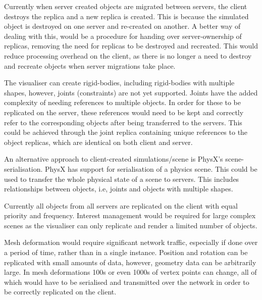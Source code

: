 Currently when server created objects are migrated between servers, the client destroys the replica and a new replica is created. This is because the simulated object is destroyed on one server and re-created on another. A better way of dealing with this, would be a procedure for handing over server-ownership of replicas, removing the need for replicas to be destroyed and recreated. This would reduce processing overhead on the client, as there is no longer a need to destroy and recreate objects when server migrations take place.


The visualiser can create rigid-bodies, including rigid-bodies with multiple shapes, however, joints (constraints) are not yet supported. Joints have the added complexity of needing references to multiple objects. In order for these to be replicated on the server, these references would need to be kept and correctly refer to the corresponding objects after being transferred to the servers. This could be achieved through the joint replica containing unique references to the object replicas, which are identical on both client and server.

An alternative approach to client-created simulations/scene is PhysX's scene-serialisation. PhysX has support for serialisation of a physics scene. This could be used to transfer the whole physical state of a scene to servers. This includes relationships between objects, i.e, joints and objects with multiple shapes.

Currently all objects from all servers are replicated on the client with equal priority and frequency. Interest management would be required for large complex scenes as the visualiser can only replicate and render a limited number of objects.

Mesh deformation would require significant network traffic, especially if done over a period of time, rather than in a single instance. Position and rotation can be replicated with small amounts of data, however, geometry data can be arbitrarily large. In mesh deformations 100s or even 1000s of vertex points can change, all of which would have to be serialised and transmitted over the network in order to be correctly replicated on the client.
